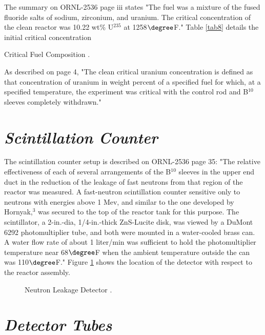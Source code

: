 \documentclass[ms,a4paper]{memoir}
\newcommand*{\msrarchive}{../../msr-archive}%
\begin{document}
The summary on ORNL-2536 page iii states "The fuel was a mixture of the fused fluoride salts of sodium, zirconium, and uranium. The critical concentration of the clean reactor was 10.22 wt\% U$^{235}$ at 1258$\degree$F." Table \ref{tab8} details the initial critical concentration

\begin{table}[H]
  \centering
  \caption{Critical Fuel Composition \parencite[Table 1]{ornl-2536}.}
  \label{tab8}
\end{table}

As described on page 4, "The clean critical uranium concentration is defined as that concentration of uranium in weight percent of a specified fuel for which, at a specified temperature, the experiment was critical with the control rod and B$^{10}$ sleeves completely withdrawn."

\section{\emph{Scintillation Counter}}

The scintillation counter setup is described on ORNL-2536 page 35: "The relative effectiveness of each of several arrangements of the B$^{10}$ sleeves in the upper end duct in the reduction of the leakage of fast neutrons from that region of the reactor was measured. A fast-neutron scintillation counter sensitive only to neutrons with energies above 1 Mev, and similar to the one developed by Hornyak,$^3$ was secured to the top of the reactor tank for this purpose. The scintillator, a 2-in.-dia, 1/4-in.-thick ZnS-Lucite disk, was viewed by a DuMont 6292 photomultiplier tube, and both were mounted in a water-cooled brass can. A water flow rate of about 1 liter/min was sufficient to hold the photomultiplier temperature near 68$\degree$F when the ambient temperature outside the can was 110$\degree$F." Figure \ref{fig6} shows the location of the detector with respect to the reactor assembly.

\begin{figure}[H]
  \centering
  \caption{Neutron Leakage Detector \parencite[Figure 16]{ornl-2536}.}
  \label{fig6}
\end{figure}

\section{\emph{Detector Tubes}}
\end{document}
